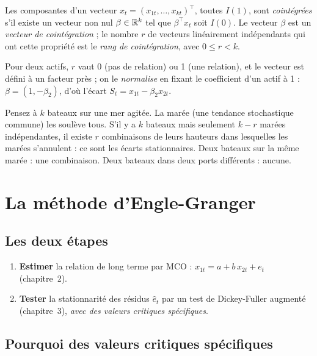 \begin{definition}
Les composantes d'un vecteur $x_t = (x_{1t},\dots,x_{kt})^\top$, toutes $I(1)$, sont \emph{cointégrées} s'il existe un vecteur non nul $\beta\in\mathbb{R}^k$ tel que $\beta^\top x_t$ soit $I(0)$. Le vecteur $\beta$ est un \emph{vecteur de cointégration} ; le nombre $r$ de vecteurs linéairement indépendants qui ont cette propriété est le \emph{rang de cointégration}, avec $0\le r < k$.
\end{definition}

Pour deux actifs, $r$ vaut 0 (pas de relation) ou 1 (une relation), et le vecteur est défini à un facteur près ; on le \emph{normalise} en fixant le coefficient d'un actif à 1 : $\beta = (1, -\beta_2)$, d'où l'écart $S_t = x_{1t} - \beta_2x_{2t}$.

\begin{intuition}
Pensez à $k$ bateaux sur une mer agitée. La marée (une tendance stochastique commune) les soulève tous. S'il y a $k$ bateaux mais seulement $k-r$ marées indépendantes, il existe $r$ combinaisons de leurs hauteurs dans lesquelles les marées s'annulent : ce sont les écarts stationnaires. Deux bateaux sur la même marée : une combinaison. Deux bateaux dans deux ports différents : aucune.
\end{intuition}

\section{La méthode d'Engle-Granger}

\subsection{Les deux étapes}

\begin{enumerate}
\item \textbf{Estimer} la relation de long terme par MCO : $x_{1t} = a + b\,x_{2t} + e_t$ (chapitre~2).
\item \textbf{Tester} la stationnarité des résidus $\hat e_t$ par un test de Dickey-Fuller augmenté (chapitre~3), \emph{avec des valeurs critiques spécifiques}.
\end{enumerate}

\subsection{Pourquoi des valeurs critiques spécifiques}

